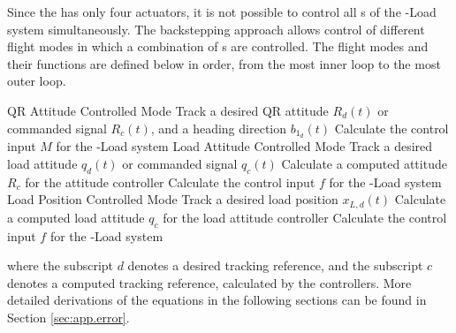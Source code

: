Since the  has only four actuators, it is not possible to control all s of the -Load system simultaneously. The backstepping approach allows control of different flight modes in which a combination of s are controlled. The flight modes and their functions are defined below in order, from the most inner loop to the most outer loop.
\begin{outline}
	\1 QR Attitude Controlled Mode 
	\2 Track a desired QR attitude $ R_d(t) $ or commanded signal $ R_c(t) $, and a heading direction $ b_{1_d}(t) $
	\2 Calculate the control input $ M $ for the -Load system
	\1 Load Attitude Controlled Mode 
	\2 Track a desired load attitude $ q_d(t) $ or commanded signal $ q_c(t) $
	\2 Calculate a computed  attitude $ R_c $ for the  attitude controller
	\2 Calculate the control input $ f $ for the -Load system	
	\1 Load Position Controlled Mode
	\2 Track a desired load position $ x_{L,d}(t) $
	\2 Calculate a computed load attitude $ q_c $ for the load attitude controller
	\2 Calculate the control input $ f $ for the -Load system		
\end{outline}
where the subscript $d $ denotes a desired tracking reference, and the subscript $ c $ denotes a computed tracking reference, calculated by the controllers. 
More detailed derivations of the equations in the following sections can be found in Section \ref{sec:app.error}.

